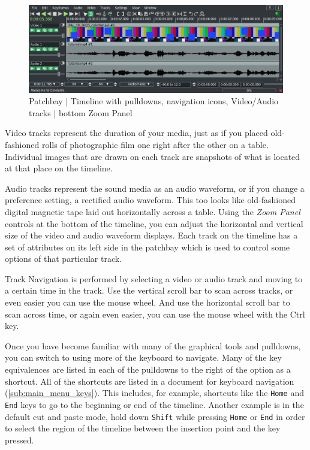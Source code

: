 \begin{figure}[htpb]
    \centering
    \includegraphics[width=0.8\linewidth]{images/patchbay.png}
    \caption{Patchbay  | Timeline with pulldowns, navigation icons, Video/Audio tracks | bottom Zoom Panel}
    \label{fig:patchbay}
\end{figure}

Video tracks represent the duration of your media, just as if you placed old-fashioned rolls of photographic
film one right after the other on a table.
Individual images that are drawn on each track are snapshots of what is located at that place on the timeline.

Audio tracks represent the sound media as an audio waveform, or if you change a preference setting, a rectified audio waveform. 
This too looks like old-fashioned digital magnetic tape laid out horizontally across a table.
Using the \textit{Zoom Panel} controls at the bottom of the timeline,
you can adjust the horizontal and vertical size of the video and audio waveform displays.
Each track on the timeline has a set of attributes on its left side in the patchbay which is used to 
control some options of that particular track. 

Track Navigation is performed by selecting a video or audio track and moving to a certain time in the track. 
Use the vertical scroll bar to scan across tracks, or even easier you can use the mouse wheel. 
And use the horizontal scroll bar to scan across time, or again even easier, you can use the mouse wheel with the Ctrl key.  

Once you have become familiar with many of the graphical tools and pulldowns, you can switch to using more of
the keyboard to navigate.  Many of the key equivalences are listed in each of the pulldowns to the right of the option
 as a shortcut. All of the shortcuts are listed in a document for keyboard 
navigation (\ref{sub:main_menu_keys}). This includes, for example, shortcuts like the \texttt{Home} and \texttt{End} keys to go to the beginning or end of the timeline.  
Another example is in the default cut and paste mode, hold down \texttt{Shift} while pressing \texttt{Home} or \texttt{End} in order to select the region of the timeline between the insertion point and the key pressed.

